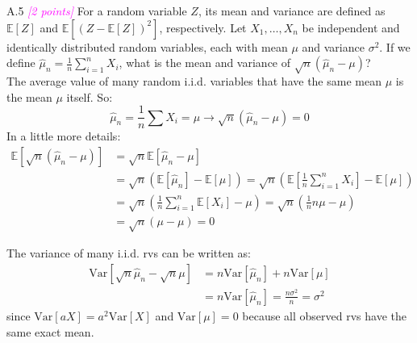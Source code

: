 \documentclass{article}
\newcommand{\1}{\mathbf{1}}
\newcommand{\E}{\mathbb{E}}
\newcommand{\points}[1]{\small\textcolor{magenta}{\emph{[#1 points]}} \normalsize}
\begin{document}
A.5 \points{2} For a random variable $Z$, its mean and variance are defined as $\E[Z]$ and $\E[(Z-\E[Z])^2]$, respectively. Let $X_1,\dots,X_n$ be independent and identically distributed random variables, each with mean $\mu$ and variance $\sigma^2$. If we define $\widehat{\mu}_n = \frac{1}{n} \sum_{i=1}^n X_i$, what is the mean and variance of $\sqrt{n}(\widehat{\mu}_n - \mu)$? \\

The average value of many random i.i.d. variables that have the same mean $\mu$ is the mean $\mu$ itself. So:
$$\hat\mu_n = \frac{1}{n}\sum X_i = \mu \rightarrow \sqrt{n}(\hat\mu_n - \mu) = 0$$
In a little more details: 
\begin{align*}
\E[\sqrt{n}(\hat\mu_n - \mu)] &= \sqrt n \E\left[\hat\mu_n - \mu\right] \\
&=\sqrt n \left(\E[\hat\mu_n] - \E[\mu]\right) = \sqrt n \left(\E\left[\frac{1}{n} \sum_{i=1}^n X_i\right] - \E[\mu]\right)\\
&= \sqrt n \left(\frac{1}{n}\sum_{i=1}^n \E[X_i] - \mu\right) = \sqrt n \left(\frac{1}{n}n\mu - \mu\right) \\
&= \sqrt n (\mu - \mu) = 0
\end{align*}

The variance of many i.i.d. rvs can be written as:
\begin{align*}
    \text{Var}[\sqrt n \hat\mu_n - \sqrt n \mu] &= n\text{Var}[\hat\mu_n]+n\text{Var}[\mu] \\
    &= n \text{Var}[\hat\mu_n] = \frac{n\sigma^2}{n} = \sigma^2
\end{align*}
since $\text{Var}[aX]=a^2\text{Var}[X]$ and $\text{Var}[\mu]=0$ because all observed rvs have the same exact mean.\\
\end{document}
